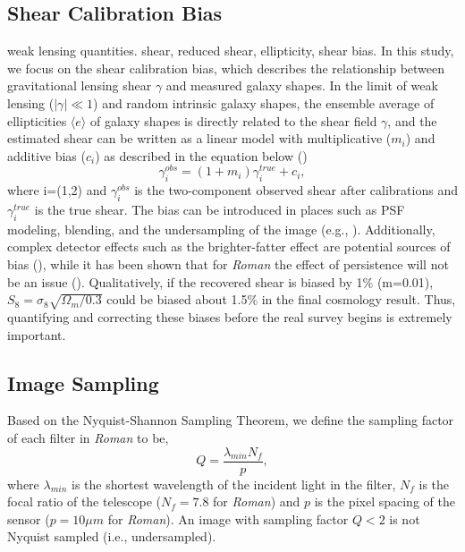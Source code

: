 \documentclass[fleqn,usenatbib]{mnras}
\begin{document}
\subsection{Shear Calibration Bias}
weak lensing quantities. shear, reduced shear, ellipticity, shear bias.
In this study, we focus on the shear calibration bias, which describes the relationship between gravitational lensing shear $\gamma$ and measured galaxy shapes. In the limit of weak lensing ($\lvert\gamma\rvert\ll1$) and random intrinsic galaxy shapes, the ensemble average of ellipticities $\langle e \rangle$ of galaxy shapes is directly related to the shear field $\gamma$, and the estimated shear can be written as a linear model with multiplicative ($m_{i}$) and additive bias ($c_{i}$) as described in the equation below (\citealt{2006MNRAS.368.1323H, 2006MNRAS.366..101H, 2007MNRAS.376...13M}) 
\begin{equation}
    \gamma^{obs}_{i} = (1+m_{i})\gamma^{true}_{i} + c_{i}, 
    \label{eqn:linear}
\end{equation}
where i=(1,2) and $\gamma^{obs}_{i}$ is the two-component observed shear after calibrations and $\gamma^{true}_{i}$ is the true shear. The bias can be introduced in places such as PSF modeling, blending, and the undersampling of the image (e.g., \citealt{2018ARA&A..56..393M}). Additionally, complex detector effects such as the brighter-fatter effect are potential sources of bias (\citealt{2013MNRAS.429..661M}), while it has been shown that for \emph{Roman} the effect of persistence will not be an issue (\citealt{2021arXiv210610273L}). Qualitatively, if the recovered shear is biased by 1$\%$ (m=0.01), $S_{8} = \sigma_{8} \sqrt{\Omega_{m}/0.3}$ could be biased about 1.5$\%$ in the final cosmology result. Thus, quantifying and correcting these biases before the real survey begins is extremely important. \par

\subsection{Image Sampling}
Based on the Nyquist-Shannon Sampling Theorem, 
we define the sampling factor of each filter in \emph{Roman} to be, 
\begin{equation}
    Q = \frac{\lambda_{min}N_{f}}{p}, 
    \label{eqn:sampling}
\end{equation}
where $\lambda_{min}$ is the shortest wavelength of the incident light in the filter, $N_{f}$ is the focal ratio of the telescope ($N_{f}=7.8$ for \emph{Roman}) and $p$ is the pixel spacing of the sensor ($p=10\mu m$ for \emph{Roman}). An image with sampling factor $Q < 2$ is not Nyquist sampled (i.e., undersampled). 
\end{document}
